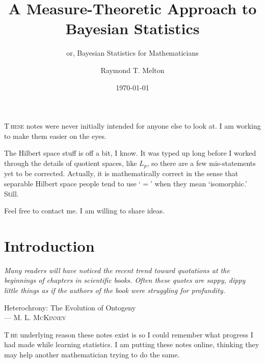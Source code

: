 \documentclass[
twoside=true,
paper=letter,
fontsize=9pt,
pagesize=auto,
leqno,
openany,
headsepline,
overfullrule,
]{scrbook}
\title{A Measure-Theoretic Approach to Bayesian Statistics}
\subtitle{or, Bayesian Statistics for Mathematicians}
\author{\textsf{Raymond T. Melton}}
\date{\textsf{\today}}
\theoremstyle{plain}
\theoremstyle{plain}
\theoremstyle{definition}
\theoremstyle{bfnoteitalic}
\theoremstyle{bfnoteroman}
\begin{document}
\frontmatter



\maketitle
{\renewcommand*\normalfont{}%
\normalfont%
\tableofcontents
}


\lettrine{T}{\,hese} notes were never initially intended for anyone else to look at.
I am working to make them easier on the eyes.

The Hilbert space stuff is off a bit, I know.
It was typed up long before I worked through the details of quotient spaces, like $L_p$, so there are a few mis-statements yet to be corrected. Actually, it is mathematically correct in the sense that separable Hilbert space people tend to use `$=$' when they mean `isomorphic.' Still.

Feel free to contact me. I am willing to share ideas.



\mainmatter
\chapter{Introduction}
\epigraph{\textit{Many readers will have noticed the recent trend toward quotations at the beginnings of chapters in scientific books.  Often these quotes are sappy, dippy little things as if the authors of the book were struggling for profundity.}}
{{Heterochrony: The Evolution of Ontogeny}\\ \textsc{--- M. L. McKinney}}

\lettrine{T}{\,he} underlying reason these notes exist is so I could remember what progress I had made while learning statistics.
I am putting these notes online, thinking  they may help another mathematician trying to do the same.
\end{document}
